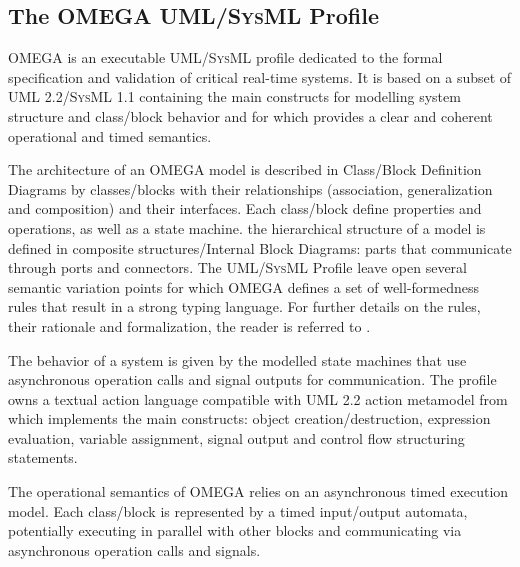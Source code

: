 \documentclass[a4paper,twoside]{article}
\def\sysml{\textsc{SysML}}
\def\uml{\textsc{UML}}
\begin{document}
\subsection{The OMEGA \uml{}/\sysml{} Profile}

OMEGA is an executable \uml{}/\sysml{} profile dedicated to the formal specification and validation of critical real-time systems. It is based on a subset of \uml{} 2.2/\sysml{} 1.1 containing the main constructs for modelling system structure and class/block behavior and for which provides a clear and coherent operational and timed semantics.


The architecture of an OMEGA model is described in Class/Block Definition Diagrams by classes/blocks with their relationships (association, generalization and composition) and their interfaces. Each class/block define properties and operations, as well as a state machine. the hierarchical structure of a model is defined in composite structures/Internal Block Diagrams: parts that communicate through ports and connectors. The \uml{}/\sysml{} Profile leave open several semantic variation points for which OMEGA defines a set of well-formedness rules that result in a strong typing language. For further details on the rules, their rationale and formalization, the reader is referred to \cite{test11}.


The behavior of a system is given by the modelled state machines that use asynchronous operation calls and signal outputs for communication. The profile owns a textual action language compatible with \uml{} 2.2 action metamodel from which implements the main constructs: object creation/destruction, expression evaluation, variable assignment, signal output and control flow structuring statements.


The operational semantics of OMEGA relies on an asynchronous timed execution model. Each class/block is represented by a timed input/output automata, potentially executing in parallel with other blocks and communicating via asynchronous operation calls and signals. 
\end{document}
